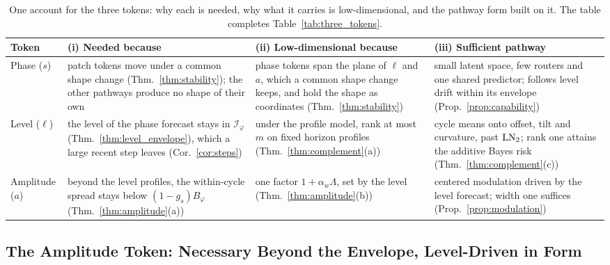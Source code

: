 {\begin{table}[t]
\centering
\caption{One account for the three tokens: why each is needed, why what it carries is low-dimensional, and the pathway form built on it. The table completes Table~\ref{tab:three_tokens}.}
\label{tab:unified_view}
\footnotesize
\setlength{\tabcolsep}{4pt}
\begin{tabular}{@{}p{}p{}p{}p{}@{}}
\toprule
Token & (i) Needed because & (ii) Low-dimensional because & (iii) Sufficient pathway \\
\midrule
Phase ($s$) & patch tokens move under a common shape change (Thm.~\ref{thm:stability}); the other pathways produce no shape of their own & phase tokens span the plane of $\ell$ and $a$, which a common shape change keeps, and hold the shape as coordinates (Thm.~\ref{thm:stability}) & small latent space, few routers and one shared predictor; follows level drift within its envelope (Prop.~\ref{prop:capability}) \\
\addlinespace
Level ($\ell$) & the level of the phase forecast stays in $\mathcal I_\varphi$ (Thm.~\ref{thm:level_envelope}), which a large recent step leaves (Cor.~\ref{cor:steps}) & under the profile model, rank at most $m$ on fixed horizon profiles (Thm.~\ref{thm:complement}(a)) & cycle means onto offset, tilt and curvature, past $\operatorname{LN}_2$; rank one attains the additive Bayes risk (Thm.~\ref{thm:complement}(c)) \\
\addlinespace
Amplitude ($a$) & beyond the level profiles, the within-cycle spread stays below $(1-g_s)B_\varphi$ (Thm.~\ref{thm:amplitude}(a)) & one factor $1+\alpha_w\Lambda$, set by the level (Thm.~\ref{thm:amplitude}(b)) & centered modulation driven by the level forecast; width one suffices (Prop.~\ref{prop:modulation}) \\
\bottomrule
\end{tabular}
\end{table}

\subsection{The Amplitude Token: Necessary Beyond the Envelope, Level-Driven in Form}
\label{sec:theory_amplitude}

}
